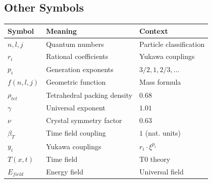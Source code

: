 \subsection{Other Symbols}
\begin{longtable}{lll}
	\toprule
	\textbf{Symbol} & \textbf{Meaning} & \textbf{Context} \\
	\midrule
	$n, l, j$ & Quantum numbers & Particle classification \\
	$r_i$ & Rational coefficients & Yukawa couplings \\
	$p_i$ & Generation exponents & $3/2, 1, 2/3, ...$ \\
	$f(n,l,j)$ & Geometric function & Mass formula \\
	$\rho_{tet}$ & Tetrahedral packing density & $0.68$ \\
	$\gamma$ & Universal exponent & $1.01$ \\
	$\nu$ & Crystal symmetry factor & $0.63$ \\
	$\beta_T$ & Time field coupling & $1$ (nat. units) \\
	$y_i$ & Yukawa couplings & $r_i \cdot \xi^{p_i}$ \\
	$T(x,t)$ & Time field & T0 theory \\
	$E_{field}$ & Energy field & Universal field \\
	\bottomrule
\end{longtable}
\normalsize	
\appendix
